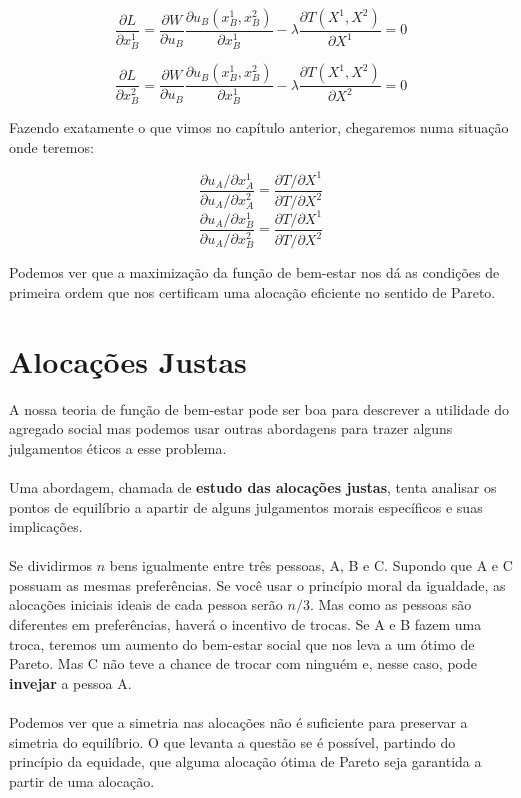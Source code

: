 \documentclass[a4paper,11pt,oneside]{book}
\theoremstyle{definition}
\theoremstyle{break}
\begin{document}
$$ \frac{\partial L}{\partial x_B^1} = \frac{\partial W}{\partial u_B} \frac{\partial u_B(x_B^1,x_B^2)}{\partial x_B^1} - \lambda \frac{\partial T(X^1,X^2)}{\partial X^1} = 0 $$

$$ \frac{\partial L}{\partial x_B^2} = \frac{\partial W}{\partial u_B} \frac{\partial u_B(x_B^1,x_B^2)}{\partial x_B^1} - \lambda \frac{\partial T(X^1,X^2)}{\partial X^2} = 0 $$

Fazendo exatamente o que vimos no capítulo anterior, chegaremos numa situação onde teremos:

$$ \frac{\partial u_A / \partial x_A^1}{\partial u_A / \partial x_A^2} = \frac{\partial T / \partial X^1}{\partial T / \partial X^2} $$
$$ \frac{\partial u_A / \partial x_B^1}{\partial u_A / \partial x_B^2} = \frac{\partial T / \partial X^1}{\partial T / \partial X^2} $$

Podemos ver que a maximização da função de bem-estar nos dá as condições de primeira ordem que nos certificam uma alocação eficiente no sentido de Pareto.

\section{Alocações Justas}

A nossa teoria de função de bem-estar pode ser boa para descrever a utilidade do agregado social mas podemos usar outras abordagens para trazer alguns julgamentos éticos a esse problema.
\\
\\
Uma abordagem, chamada de \textbf{estudo das alocações justas}, tenta analisar os pontos de equilíbrio a apartir de alguns julgamentos morais específicos e suas implicações.
\\
\\
Se dividirmos $n$ bens igualmente entre três pessoas, A, B e C. Supondo que A e C possuam as mesmas preferências. Se você usar o princípio moral da igualdade, as alocações iniciais ideais de cada pessoa serão $n/3$. Mas como as pessoas são diferentes em preferências, haverá o incentivo de trocas. Se A e B fazem uma troca, teremos um aumento do bem-estar social que nos leva a um ótimo de Pareto. Mas C não teve a chance de trocar com ninguém e, nesse caso, pode \textbf{invejar} a pessoa A.
\\
\\
Podemos ver que a simetria nas alocações não é suficiente para preservar a simetria do equilíbrio. O que levanta a questão se é possível, partindo do princípio da equidade, que alguma alocação ótima de Pareto seja garantida a partir de uma alocação.
\end{document}
